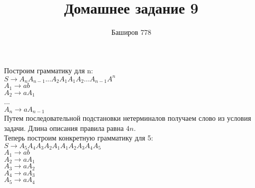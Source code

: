 \documentclass[a4paper,12pt]{article}
\author{Баширов 778}
\title{Домашнее задание 9}
\begin{document}
\maketitle
\newpage

\section{}
Построим грамматику для n:\\
$S\rightarrow A_n A_{n-1} ...A_2 A_1 A_1 A_2 ... A_{n-1} A^n $\\
$A_{1}\rightarrow ab $\\
$A_{2}\rightarrow aA_{1}$\\
...\\
$A_{n}\rightarrow aA_{n-1}$\\
Путем последовательной подстановки нетерминалов получаем слово из условия задачи. Длина описания правила равна $4n$.\\
Теперь построим конкретную грамматику для 5:\\ 
$S\rightarrow A_5 A_4 A_3 A_2 A_1 A_1 A_2 A_3 A_4 A_5 $\\
$A_1\rightarrow ab $\\
$A_2\rightarrow aA_1$\\
$A_3\rightarrow aA_2$\\
$A_4\rightarrow aA_3$\\
$A_5\rightarrow aA_4$\\

\section{}
\end{document}
